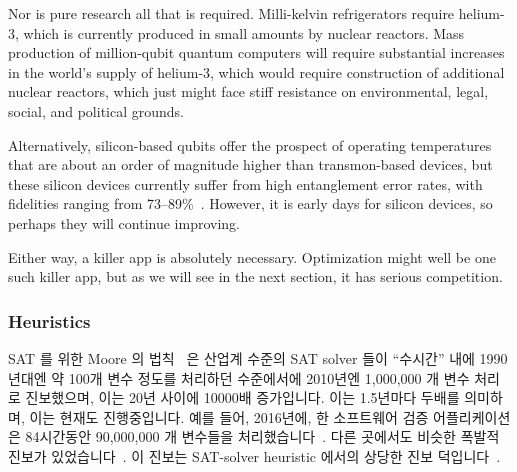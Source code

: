 Nor is pure research all that is required.
Milli-kelvin refrigerators require helium-3, which is currently
produced in small amounts by nuclear reactors.
Mass production of million-qubit quantum computers will require
substantial increases in the world's supply of helium-3, which would
require construction of additional nuclear reactors, which just might face
stiff resistance on environmental, legal, social, and political grounds.

Alternatively, silicon-based qubits offer the prospect of
operating temperatures that are about an order of magnitude higher than
transmon-based devices, but these silicon devices currently suffer from
high entanglement error rates, with fidelities ranging from
73--89\%~\cite{TFWatson2017SiliconQubit}.
However, it is early days for silicon devices, so perhaps they will
continue improving.

Either way, a killer app is absolutely necessary.
Optimization might well be one such killer app, but as we will see in the
next section, it has serious competition.
\fi

\subsubsection{Heuristics}
\label{sec:future:Heuristics}

SAT 를 위한 Moore 의 법칙~\cite[Fig.~2.3]{Kroening:2008:DPA:1391237} 은 산업계
수준의 SAT solver 들이 ``수시간'' 내에 1990년대엔 약 100개 변수 정도를 처리하던
수준에서에 2010년엔 1,000,000 개 변수 처리로 진보했으며, 이는 20년 사이에
10000배 증가입니다.
이는 1.5년마다 두배를 의미하며, 이는 현재도 진행중입니다.
예를 들어, 2016년에, 한 소프트웨어 검증 어플리케이션은 84시간동안 90,000,000 개
변수들을 처리했습니다~\cite{LihaoLiang2016VerifyTreeRCU}.
다른 곳에서도 비슷한 폭발적 진보가
있었습니다~\cite{SharadMalik2010SATSolverHistory,SATCompetition2002,vanHarmelen:2007:HKR:1557461,Malik:2009:BST:1536616.1536637,JamesEzick2014ExtremeSAT}.
이 진보는 SAT-solver heuristic 에서의 상당한 진보
덕입니다~\cite{Kroening:2008:DPA:1391237,Zhang:2002:QEB:647771.734434,SharadMalik2010SATSolverHistory,Malik:2009:BST:1536616.1536637,Audemard:2009:PLC:1661445.1661509}.

